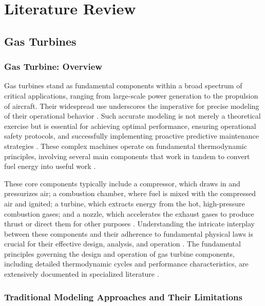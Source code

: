 \documentclass[
  12pt,
  oneside,
  a4paper,
  english,
  brazil]{abntex2}
\author{}
\date{}
\begin{document}
\chapter{\textbf{Literature Review}}

\section{\texorpdfstring{\textbf{Gas Turbines}}{}}\label{section}

\subsection{Gas Turbine: Overview}\label{gas-turbine-overview}

Gas turbines stand as fundamental components within a broad spectrum of
critical applications, ranging from large-scale power generation to the
propulsion of aircraft. Their widespread use underscores the imperative
for precise modeling of their operational behavior
\citet{boyce2012gasturbine}. Such accurate modeling is not merely a
theoretical exercise but is essential for achieving optimal performance,
ensuring operational safety protocols, and successfully implementing
proactive predictive maintenance strategies \citet{boyce2012gasturbine}.
These complex machines operate on fundamental thermodynamic principles,
involving several main components that work in tandem to convert fuel
energy into useful work \citet{cengel2019thermodynamics}.

These core components typically include a compressor, which draws in and
pressurizes air; a combustion chamber, where fuel is mixed with the
compressed air and ignited; a turbine, which extracts energy from the
hot, high-pressure combustion gases; and a nozzle, which accelerates the
exhaust gases to produce thrust or direct them for other purposes
\citet{saravanamuttoo2017gasturbine}. Understanding the intricate
interplay between these components and their adherence to fundamental
physical laws is crucial for their effective design, analysis, and
operation \citet{saravanamuttoo2017gasturbine}. The fundamental
principles governing the design and operation of gas turbine components,
including detailed thermodynamic cycles and performance characteristics,
are extensively documented in specialized literature
\citet{saravanamuttoo2017gasturbine}.

\subsection{Traditional Modeling Approaches and Their
Limitations}\label{traditional-modeling-approaches-and-their-limitations}
\end{document}
